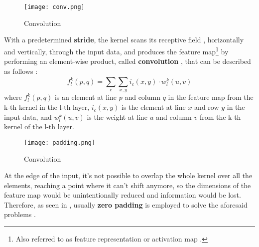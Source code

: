 \documentclass[class=report, crop=false, a4paper, 12pt]{standalone}
\begin{document}
\begin{figure}[!h]
    \centering
    \texttt{[image: conv.png]} %
    \caption{Convolution}
    \label{fig:conv}
\end{figure}

\par With a predetermined \textbf{stride}, the kernel scans its receptive field \autocite{khanSurveyRecentArchitectures2020}, horizontally and vertically, through the input data, and produces the feature map\footnote{Also referred to as feature representation \autocite{liSurveyConvolutionalNeural2022} or activation map \autocite{ajitReviewConvolutionalNeural2020}.} \autocite{lecunDeepLearning2015, alzubaidiReviewDeepLearning2021} by performing an element-wise product, called \textbf{convolution} , that can be described as follows \autocite{khanSurveyRecentArchitectures2020}:
$$
f_l^k(p, q) = \sum_{c}^{}\sum_{x, y}^{}i_c(x, y)\cdot w^k_l(u,v)
$$
where $f_l^k(p, q)$ is an element at line $p$ and column $q$ in the feature map from the k-th kernel in the l-th layer, $i_c(x, y)$ is the element at line $x$ and row $y$ in the input data, and $w^k_l(u,v)$ is the weight at line $u$ and column $v$ from the k-th kernel of the l-th layer. 


\begin{figure}[!h]
    \centering
    \texttt{[image: padding.png]} %
    \caption{Convolution}
    \label{fig:padding}
\end{figure}

\par At the edge of the input, it's not possible to overlap the whole kernel over all the elements, reaching a point where it can't shift anymore, so the dimensions of the feature map would be unintentionally reduced and information would be lost. Therefore, as seen in , usually \textbf{zero padding} is employed to solve the aforesaid problems \autocite{yamashitaConvolutionalNeuralNetworks2018}.
\end{document}
